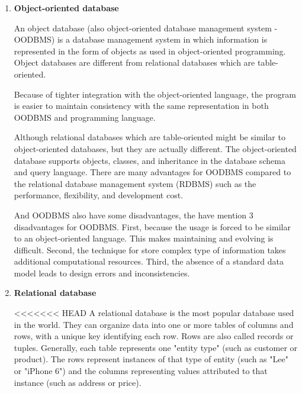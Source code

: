 \begin{enumerate}
	\item\textbf{Object-oriented database}
	\setlength{\parindent}{1em}
	
	
	An object database (also object-oriented database management system - OODBMS) is a database management system in which information is represented in the form of objects as used in object-oriented programming. Object databases are different from relational databases which are table-oriented.
	
	Because of tighter integration with the object-oriented language, the program is easier to maintain consistency with the same representation in both OODBMS and programming language.
	
	Although relational databases which are table-oriented might be similar to object-oriented databases, but they are actually different. The object-oriented database supports objects, classes, and inheritance in the database schema and query language.
	There are many advantages for OODBMS compared to the relational database management system (RDBMS) such as the performance, flexibility, and development cost.
	
	And OODBMS also have some disadvantages, the have mention 3 disadvantages for OODBMS. First, because the usage is forced to be similar to an object-oriented language. This makes maintaining and evolving is difficult. Second, the technique for store complex type of information takes additional computational resources. Third, the absence of a standard data model leads to design errors and inconsistencies.
	
	
	\item\textbf{Relational database}
	\setlength{\parindent}{1em}
	
<<<<<<< HEAD
    A relational database is the most popular database used in the world. They can organize data into one or more tables of columns and rows, with a unique key identifying each row. Rows are also called records or tuples. Generally, each table represents one "entity type" (such as customer or product). The rows represent instances of that type of entity (such as "Lee" or "iPhone 6") and the columns representing values attributed to that instance (such as address or price).
    

\end{enumerate}
